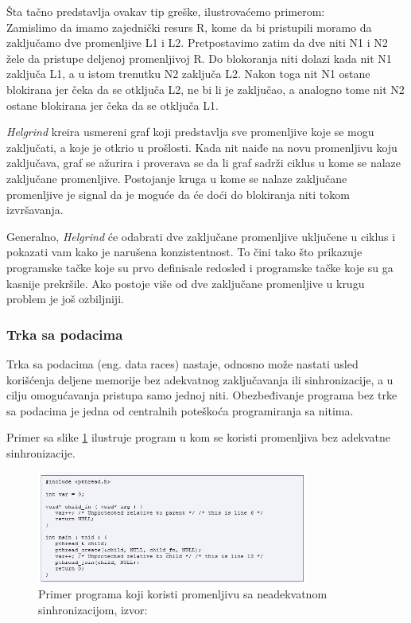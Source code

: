 \documentclass[12pt,oneside]{memoir}
\theoremstyle{plain}
\theoremstyle{definition}
\begin{document}
Šta tačno predstavlja ovakav tip greške, ilustrovaćemo primerom:\\
Zamislimo da imamo zajednički resurs R, kome da bi pristupili moramo da zaključamo dve promenljive L1 i L2. Pretpostavimo zatim da dve niti N1 i N2 žele da pristupe deljenoj promenljivoj R. Do blokoranja niti dolazi kada nit N1 zaključa L1, a u istom trenutku N2 zaključa L2. Nakon toga nit N1 ostane blokirana jer čeka da se otključa L2, ne bi li je zaključao, a analogno tome nit N2 ostane blokirana jer čeka da se otključa L1.

\textit{Helgrind} kreira usmereni graf koji predstavlja sve promenljive koje se mogu zaključati, a koje je otkrio u prošlosti. Kada nit naiđe na novu promenljivu koju zaključava, graf se ažurira i proverava se da li graf sadrži ciklus u kome se nalaze zaključane promenljive. Postojanje kruga u kome se nalaze zaključane promenljive je signal da je moguće da će doći do blokiranja niti tokom izvršavanja.

Generalno, \textit{Helgrind} će odabrati dve zaključane promenljive uključene u ciklus i pokazati vam kako je narušena konzistentnost. To čini tako što prikazuje programske tačke koje su prvo definisale redosled i programske tačke koje su ga kasnije prekršile. Ako postoje više od dve zaključane promenljive u krugu problem je još ozbiljniji.


\subsubsection{Trka sa podacima}
Trka sa podacima (eng. data races) nastaje, odnosno može nastati usled korišćenja deljene memorije bez adekvatnog zaključavanja ili sinhronizacije, a u cilju omogućavanja pristupa samo jednoj niti. Obezbeđivanje programa bez trke sa podacima je jedna od centralnih poteškoća programiranja sa nitima. 

Primer sa slike \ref{fig:slika2.20} ilustruje program u kom se koristi promenljiva bez adekvatne sinhronizacije.
\begin{figure}[!ht]
  \centering
  \includegraphics[width=0.8\textwidth]{DataRace.png}
  \caption{Primer programa koji koristi promenljivu sa neadekvatnom sinhronizacijom, izvor: \cite{Helgrind}}
  \label{fig:slika2.20}
\end{figure}
\end{document}
